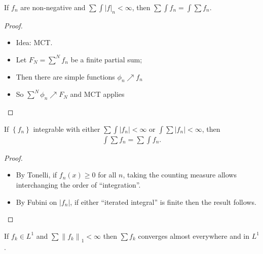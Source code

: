 \begin{proposition}

If \(f_n\) are non-negative and
\(\sum \int {\left\lvert {f} \right\rvert}_n < \infty\), then
\(\sum \int f_n = \int \sum f_n\).

\end{proposition}

\begin{proof}

\begin{itemize}
\tightlist
\item
  Idea: MCT.
\item
  Let \(F_N = \sum^N f_n\) be a finite partial sum;
\item
  Then there are simple functions \(\phi_n \nearrow f_n\)
\item
  So \(\sum^N \phi_n \nearrow F_N\) and MCT applies
\end{itemize}

\end{proof}

\begin{theorem}

If \(\left\{{f_n}\right\}\) integrable with either
\(\sum \int {\left\lvert {f_n} \right\rvert} < \infty\) or
\(\int\sum {\left\lvert {f_n} \right\rvert} < \infty\), then
\begin{align*}  
\int\sum f_n = \sum \int f_n
.\end{align*}

\end{theorem}

\begin{proof}

\begin{itemize}
\tightlist
\item
  By Tonelli, if \(f_n(x) \geq 0\) for all \(n\), taking the counting
  measure allows interchanging the order of ``integration''.
\item
  By Fubini on \({\left\lvert {f_n} \right\rvert}\), if either
  ``iterated integral'' is finite then the result follows.
\end{itemize}

\end{proof}

\begin{proposition}[?]

If \(f_k \in L^1\) and
\(\sum {\left\lVert {f_k} \right\rVert}_1 < \infty\) then \(\sum f_k\)
converges almost everywhere and in \(L^1\).

\end{proposition}

